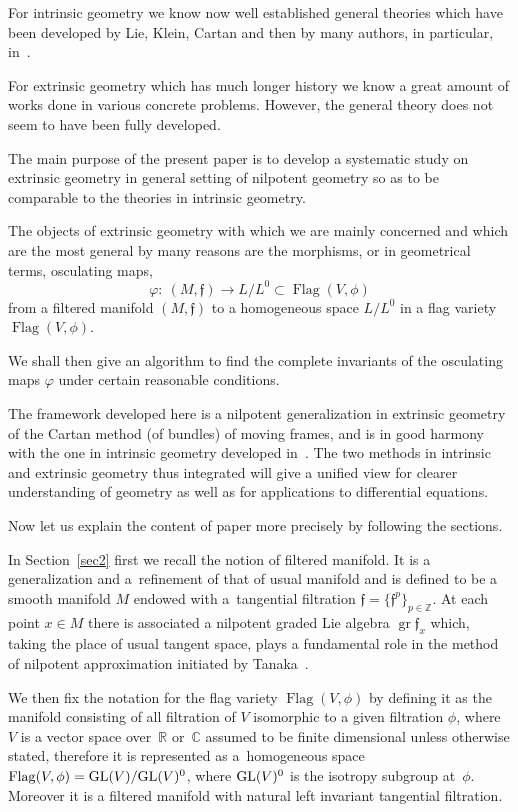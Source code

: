 \documentclass[10pt,a4paper]{amsart}
\newcommand{\Z}{\mathbb Z}
\newcommand{\f}{\mathfrak f}
\newcommand{\Flag}{\operatorname{Flag}}
\newcommand{\gr}{\operatorname{gr}}
\numberwithin{equation}{section}
\begin{document}
For intrinsic geometry we know now well established general theories which have been deve\-lo\-ped by Lie, Klein, Cartan and then
by many authors, in particular, in~\cite{car1908,car1936,Mor1983,Mor1993,sin-st65,st64,tan70,tan79}.

For extrinsic geometry which has much longer history we know a great amount of works done in various concrete problems. However, the general theory does not seem to have been fully developed.

The main purpose of the present paper is to develop a systematic study on extrinsic geometry in general setting of nilpotent geometry so as to be comparable to the theories in intrinsic geometry.

The objects of extrinsic geometry with which we are mainly concerned and which are the most general by many reasons are the morphisms, or in geometrical terms, osculating maps,
\[
\varphi\colon\ (M, \mathfrak f) \to L/L^0 \subset \Flag(V, \phi)
\]
from a filtered manifold $(M, \mathfrak f)$ to a homogeneous space $L/L^0$ in a flag variety $\Flag(V, \phi)$.

We shall then give an algorithm to find the complete invariants of the osculating maps $\varphi$ under certain reasonable conditions.

The framework developed here is a nilpotent generalization in extrinsic geometry of the Cartan method (of bundles) of moving frames, and is in good harmony with the one in intrinsic geometry developed in~\cite{Mor1993,tan70,tan79}. The two methods in intrinsic and extrinsic geometry thus integrated will give a unified view for clearer understanding of geometry as well as for applications to differential equations.

Now let us explain the content of paper more precisely by following the
sections.

In Section~\ref{sec2} first we recall the notion of filtered manifold.
It is a generalization and a~refi\-nement of that of usual manifold and is defined to be a smooth manifold $M$ endowed with a~tangential filtration $\f = \{\f^p\}_{p \in \Z}$. At each point $x \in M $ there is associated a nilpotent graded Lie algebra $\gr\f_x$
which, taking the place of usual tangent space, plays a fundamental role in the method of nilpotent approximation initiated by Tanaka~\cite{tan70,tan79}.

We then fix the notation for the flag variety $\Flag(V, \phi)$ by defining it as the manifold consisting of all filtration of $V$ isomorphic to a given filtration $\phi$, where $V$ is a vector space over~$\mathbb R$ or~$\mathbb C$ assumed to be finite dimensional unless otherwise stated,
therefore it is represented as a~homogeneous space $\Flag(V, \phi )= {\rm GL}(V)/{\rm GL}(V)^0$, where ${\rm GL}(V)^0$ is the isotropy subgroup at~$\phi$.
Moreover it is a filtered manifold with natural left invariant tangential filtration.
\end{document}
